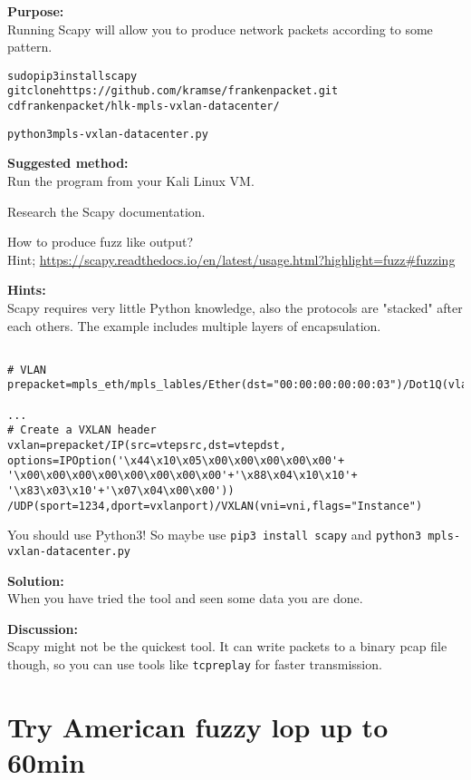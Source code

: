 \documentclass[a4paper,11pt,notitlepage]{report}
\begin{document}
{\bf Purpose:}\\
Running Scapy will allow you to produce network packets according to some pattern.

\begin{alltt}\footnotesize
sudo pip3 install scapy
git clone https://github.com/kramse/frankenpacket.git
cd frankenpacket/hlk-mpls-vxlan-datacenter/

python3 mpls-vxlan-datacenter.py
\end{alltt}


{\bf Suggested method:}\\
Run the program from your Kali Linux VM.

Research the Scapy documentation.\\

How to produce fuzz like output?\\
Hint; \url{https://scapy.readthedocs.io/en/latest/usage.html?highlight=fuzz#fuzzing}

{\bf Hints:}\\
Scapy requires very little Python knowledge, also the protocols are "stacked" after each others. The example includes multiple layers of encapsulation.

\begin{verbatim}

# VLAN
prepacket=mpls_eth/mpls_lables/Ether(dst="00:00:00:00:00:03")/Dot1Q(vlan=42)

...
# Create a VXLAN header
vxlan=prepacket/IP(src=vtepsrc,dst=vtepdst, options=IPOption('\x44\x10\x05\x00\x00\x00\x00\x00'+
'\x00\x00\x00\x00\x00\x00\x00\x00'+'\x88\x04\x10\x10'+
'\x83\x03\x10'+'\x07\x04\x00\x00'))
/UDP(sport=1234,dport=vxlanport)/VXLAN(vni=vni,flags="Instance")

\end{verbatim}


You should use Python3! So maybe use \verb+pip3 install scapy+ and \verb+python3 mpls-vxlan-datacenter.py+

{\bf Solution:}\\
When you have tried the tool and seen some data you are done.

{\bf Discussion:}\\
Scapy might not be the quickest tool. It can write packets to a binary pcap file though, so you can use tools like \verb+tcpreplay+ for faster transmission.



\chapter{Try American fuzzy lop up to 60min}
\label{ex:american-fuzzy-lop}
\end{document}
